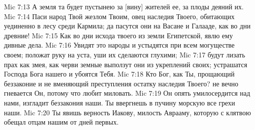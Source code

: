 Mic 7:13  А земля та будет пустынею за [вину] жителей ее, за плоды деяний их.
Mic 7:14  Паси народ Твой жезлом Твоим, овец наследия Твоего, обитающих уединенно в лесу среди Кармила; да пасутся они на Васане и Галааде, как во дни древние!
Mic 7:15  Как во дни исхода твоего из земли Египетской, явлю ему дивные дела.
Mic 7:16  Увидят это народы и устыдятся при всем могуществе своем; положат руку на уста, уши их сделаются глухими;
Mic 7:17  будут лизать прах как змея, как черви земные выползут они из укреплений своих; устрашатся Господа Бога нашего и убоятся Тебя.
Mic 7:18  Кто Бог, как Ты, прощающий беззаконие и не вменяющий преступления остатку наследия Твоего? не вечно гневается Он, потому что любит миловать.
Mic 7:19  Он опять умилосердится над нами, изгладит беззакония наши. Ты ввергнешь в пучину морскую все грехи наши.
Mic 7:20  Ты явишь верность Иакову, милость Аврааму, которую с клятвою обещал отцам нашим от дней первых.


